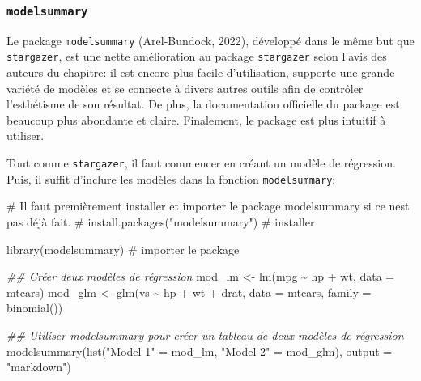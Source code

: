 \documentclass[
  letterpaper,
  DIV=11,
  numbers=noendperiod]{scrreprt}
\newenvironment{Shaded}{\begin{snugshade}}{\end{snugshade}}
\newcommand{\AttributeTok}[1]{\textcolor[rgb]{0.40,0.45,0.13}{#1}}
\newcommand{\CommentTok}[1]{\textcolor[rgb]{0.37,0.37,0.37}{#1}}
\newcommand{\DocumentationTok}[1]{\textcolor[rgb]{0.37,0.37,0.37}{\textit{#1}}}
\newcommand{\FunctionTok}[1]{\textcolor[rgb]{0.28,0.35,0.67}{#1}}
\newcommand{\NormalTok}[1]{\textcolor[rgb]{0.00,0.23,0.31}{#1}}
\newcommand{\OtherTok}[1]{\textcolor[rgb]{0.00,0.23,0.31}{#1}}
\newcommand{\SpecialCharTok}[1]{\textcolor[rgb]{0.37,0.37,0.37}{#1}}
\newcommand{\StringTok}[1]{\textcolor[rgb]{0.13,0.47,0.30}{#1}}
\begin{document}
\subsubsection{\texorpdfstring{\texttt{modelsummary}}{modelsummary}}\label{sec-model-summary}

Le package \texttt{modelsummary} (Arel-Bundock, 2022), développé dans le
même but que \texttt{stargazer}, est une nette amélioration au package
\texttt{stargazer} selon l'avis des auteurs du chapitre: il est encore
plus facile d'utilisation, supporte une grande variété de modèles et se
connecte à divers autres outils afin de contrôler l'esthétisme de son
résultat. De plus, la documentation officielle du package est beaucoup
plus abondante et claire. Finalement, le package est plus intuitif à
utiliser.

Tout comme \texttt{stargazer}, il faut commencer en créant un modèle de
régression. Puis, il suffit d'inclure les modèles dans la fonction
\texttt{modelsummary}:

\begin{Shaded}
\begin{Highlighting}[]
\CommentTok{\# Il faut premièrement installer et importer le package modelsummary si ce n\textquotesingle{}est pas déjà fait.}
\CommentTok{\# install.packages("modelsummary") \# installer}

\FunctionTok{library}\NormalTok{(modelsummary) }\CommentTok{\# importer le package}
\end{Highlighting}
\end{Shaded}

\begin{Shaded}
\begin{Highlighting}[]
\DocumentationTok{\#\# Créer deux modèles de régression}
\NormalTok{mod\_lm }\OtherTok{\textless{}{-}} \FunctionTok{lm}\NormalTok{(mpg }\SpecialCharTok{\textasciitilde{}}\NormalTok{ hp }\SpecialCharTok{+}\NormalTok{ wt, }\AttributeTok{data =}\NormalTok{ mtcars)}
\NormalTok{mod\_glm }\OtherTok{\textless{}{-}} \FunctionTok{glm}\NormalTok{(vs }\SpecialCharTok{\textasciitilde{}}\NormalTok{ hp }\SpecialCharTok{+}\NormalTok{ wt }\SpecialCharTok{+}\NormalTok{ drat, }\AttributeTok{data =}\NormalTok{ mtcars, }\AttributeTok{family =} \FunctionTok{binomial}\NormalTok{())}

\DocumentationTok{\#\# Utiliser modelsummary pour créer un tableau de deux modèles de régression}
\FunctionTok{modelsummary}\NormalTok{(}\FunctionTok{list}\NormalTok{(}\StringTok{"Model 1"} \OtherTok{=}\NormalTok{ mod\_lm, }\StringTok{"Model 2"} \OtherTok{=}\NormalTok{ mod\_glm), }\AttributeTok{output =} \StringTok{"markdown"}\NormalTok{)}
\end{Highlighting}
\end{Shaded}
\end{document}
